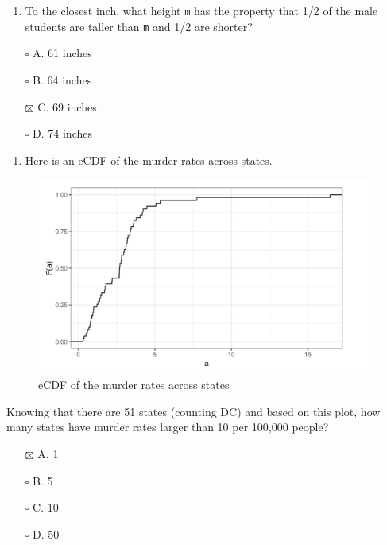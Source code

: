 \documentclass[
]{article}
\providecommand{\tightlist}{%
  \setlength{\itemsep}{0pt}\setlength{\parskip}{0pt}}
\begin{document}
\begin{enumerate}
\def\labelenumi{\arabic{enumi}.}
\setcounter{enumi}{3}
\tightlist
\item
  To the closest inch, what height \texttt{m} has the property that 1/2
  of the male students are taller than \texttt{m} and 1/2 are shorter?
\end{enumerate}

\begin{itemize}
\tightlist
\item[$\square$]
  A. 61 inches
\item[$\square$]
  B. 64 inches
\item[$\boxtimes$]
  C. 69 inches
\item[$\square$]
  D. 74 inches
\end{itemize}

\newpage

\begin{enumerate}
\def\labelenumi{\arabic{enumi}.}
\setcounter{enumi}{4}
\tightlist
\item
  Here is an eCDF of the murder rates across states.
\end{enumerate}

\begin{figure}
\centering
\includegraphics{images/eCDF murder rates across states.png}
\caption{eCDF of the murder rates across states}
\end{figure}

Knowing that there are 51 states (counting DC) and based on this plot,
how many states have murder rates larger than 10 per 100,000 people?

\begin{itemize}
\tightlist
\item[$\boxtimes$]
  A. 1
\item[$\square$]
  B. 5
\item[$\square$]
  C. 10
\item[$\square$]
  D. 50
\end{itemize}
\end{document}
